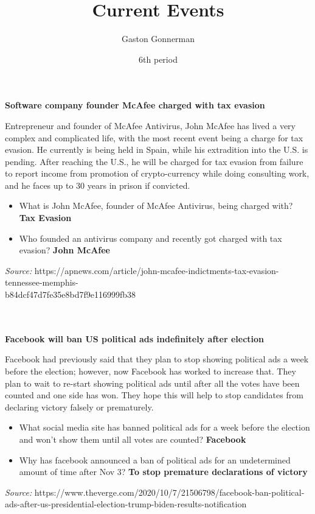 \documentclass{article}
\title{Current Events}
\author{Gaston Gonnerman}
\date{6th period}
\begin{document}
	\maketitle
	
	\begin{center}
		\large{
			\textbf{Software company founder McAfee charged with tax evasion}
		}
	\end{center}
	\par Entrepreneur and founder of McAfee Antivirus, John McAfee has lived a very complex and complicated life, with the most recent event being a charge for tax evasion. He currently is being held in Spain, while his extradition into the U.S. is pending. After reaching the U.S., he will be charged for tax evasion from failure to report income from promotion of crypto-currency while doing consulting work, and he faces up to 30 years in prison if convicted.
	
	\begin{itemize}[label=--]
		\item What is John McAfee, founder of McAfee Antivirus, being charged with? \textbf{Tax Evasion}
		\item Who founded an antivirus company and recently got charged with tax evasion? \textbf{John McAfee}
	\end{itemize}

	\noindent
	\emph{Source:} https://apnews.com/article/john-mcafee-indictments-tax-evasion-tennessee-memphis-\\b84dcf47d7fe35e8bd7f9e116999fb38
	\\ \\ \\
	
	\begin{center}
		\large{
			\textbf{Facebook will ban US political ads indefinitely after election}
		}
	\end{center}
	\par Facebook had previously said that they plan to stop showing political ads a week before the election; however, now Facebook has worked to increase that. They plan to wait to re-start showing political ads until after all the votes have been counted and one side has won. They hope this will help to stop candidates from declaring victory falsely or prematurely.
	
	\begin{itemize}[label=--]
		\item What social media site has banned political ads for a week before the election and won't show them until all votes are counted? \textbf{Facebook}
		\item Why has facebook announced a ban of political ads for an undetermined amount of time after Nov 3? \textbf{To stop premature declarations of victory}
	\end{itemize}

	\noindent
	\emph{Source:} https://www.theverge.com/2020/10/7/21506798/facebook-ban-political-ads-after-us-presidential-election-trump-biden-results-notification
\end{document}
